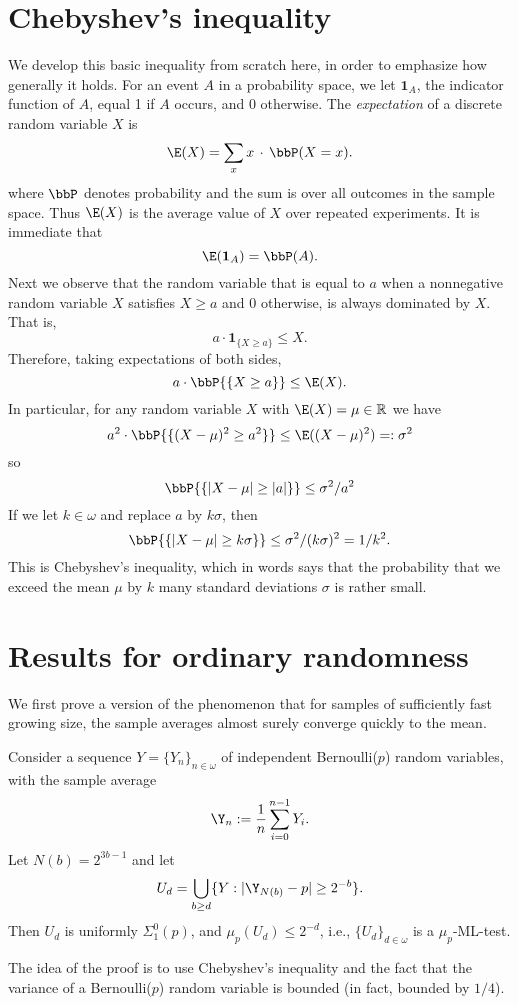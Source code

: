 \section{Chebyshev's inequality}

We develop this basic inequality from scratch here, in order to emphasize how generally it holds. For an event $A$ in a probability space, we let $\mathbf 1_A$, the indicator function of $A$, equal 1 if $A$ occurs, and $0$ otherwise. The \emph{expectation} of a discrete random variable $X$ is 
\[
\E(X)=\sum_x x\,\cdot\,\bbP(X=x).
\]
where $\bbP$ denotes probability and the sum is over all outcomes in the sample space. Thus $\E(X)$ is the average value of $X$ over repeated experiments. It is immediate that
\[
\E (\mathbf 1_{A}) = \bbP(A).
\]
Next we observe that the random variable that is equal to $a$ when a nonnegative random variable $X$ satisfies $X\ge a$ and $0$ otherwise, is always dominated by $X$. That is, 
\[
a\cdot \mathbf 1_{\{X\ge a\}} \le X.
\]
Therefore, taking expectations of both sides,
\[
a\cdot \bbP{\{X\ge a\}} \le \E(X).
\]
In particular, for any random variable $X$ with $\E(X)=\mu\in\mathbb R$ we have 
\[
a^2\cdot \bbP{\{(X-\mu)^2\ge a^2\}} \le \E ((X-\mu)^2)=:\sigma^2
\]
so
\[
\bbP{\{|X-\mu|\ge |a|\}} \le \sigma^2/a^2
\]
If we let $k\in\omega$ and replace $a$ by $k\sigma$, then
\[
\bbP{\{|X-\mu|\ge k\sigma\}} \le \sigma^2/(k\sigma)^2 = 1/k^2.
\]
This is Chebyshev's inequality, which in words says that the probability that we exceed the mean $\mu$ by $k$ many standard deviations $\sigma$ is rather small.

\section{Results for ordinary randomness}

We first prove a version of the phenomenon that for samples of sufficiently fast growing size, the sample averages almost surely converge quickly to the mean.
					
\begin{proposition}\label{is_test}
Consider a sequence $Y=\{Y_n\}_{n\in\omega}$ of independent Bernoulli($p$) random variables, with the sample average 
\[
\Y_n := \frac{1}{n}\sum_{i=0}^{n-1} Y_i.
\]
Let $N(b)=2^{3b-1}$ and let 
\[
U_d=\bigcup_{b\ge d}\{Y: |\Y_{N(b)}-p|\ge 2^{-b}\}.
\]
Then $U_d$ is uniformly $\Sigma^0_1(p)$, and $\mu_p(U_d)\le 2^{-d}$, i.e., $\{U_d\}_{d\in\omega}$ is a $\mu_p$-ML-test.
\end{proposition} 
The idea of the proof is to use Chebyshev's inequality and the fact that the variance of a Bernoulli($p$) random variable is bounded (in fact, bounded by $1/4$).


